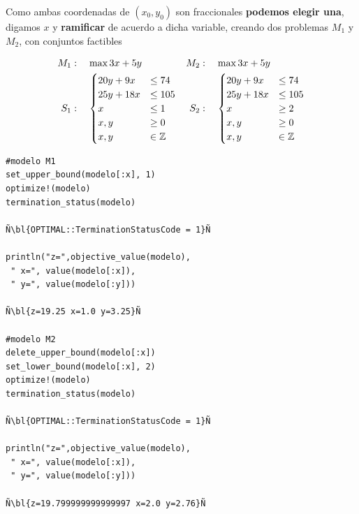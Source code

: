     Como ambas coordenadas de $(x_0,y_0)$ son fraccionales \textbf{podemos elegir una}, digamos $x$ y \textbf{ramificar} de acuerdo a dicha variable, creando dos problemas $M_1$ y $M_2$, con conjuntos factibles  
    
    \NAM{\begin{center}}{}
    \begin{minipage}{0.35\textwidth}
    	\begin{align*}
    	M_1&:\quad 	\max 3x+5y & M_2&:\quad 	\max 3x+5y\\ 
    	S_1&:\quad \begin{cases}
    	20y+9x&\leq 74\\
    	25y+18x&\leq 105\\
    	x&\leq 1\\
    	x,y&\geq 0\\
    	x,y&\in \mathbb Z\end{cases}&S_2&:\quad \begin{cases}
    	20y+9x&\leq 74\\
    	25y+18x&\leq 105\\
    	x&\geq 2\\
    	x,y&\geq 0\\
    	x,y&\in \mathbb Z\end{cases}
    	\end{align*}
    \end{minipage}
    \NAM{\end{center}}{}
    \begin{lstlisting}[escapechar=Ñ]
#modelo M1
set_upper_bound(modelo[:x], 1) 
optimize!(modelo)
termination_status(modelo)

Ñ\bl{OPTIMAL::TerminationStatusCode = 1}Ñ

println("z=",objective_value(modelo),
 " x=", value(modelo[:x]),
 " y=", value(modelo[:y]))

Ñ\bl{z=19.25 x=1.0 y=3.25}Ñ

#modelo M2
delete_upper_bound(modelo[:x]) 
set_lower_bound(modelo[:x], 2)
optimize!(modelo)
termination_status(modelo)

Ñ\bl{OPTIMAL::TerminationStatusCode = 1}Ñ

println("z=",objective_value(modelo),
 " x=", value(modelo[:x]),
 " y=", value(modelo[:y]))

Ñ\bl{z=19.799999999999997 x=2.0 y=2.76}Ñ
    \end{lstlisting}
    \NAM{
    \end{minipage}
    \end{center}
    }{
    \end{minipage}
    }
    
